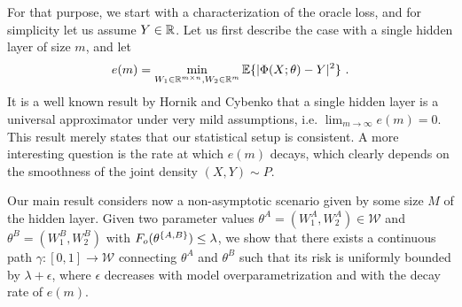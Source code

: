 For that purpose, we start with a characterization of the oracle loss, and for simplicity let us assume 
$Y \in {\mathbb{R}}$. 
Let us first describe the case with a single hidden layer of size $m$, and let
\begin{equation}
\label{bla2}
e(m) = \min_{W_1 \in {\mathbb{R}}^{m \times n}, W_2 \in {\mathbb{R}}^m} {\mathbb{E}}\{ | \Phi(X; \theta) - Y|^2 \}~.
\end{equation}
It is a well known result by Hornik and Cybenko that a single hidden layer 
is a universal approximator under very mild assumptions, i.e. $\lim_{m \to \infty} e(m) = 0$.
This result merely states that our statistical setup is consistent. A more interesting 
question is the rate at which $e(m)$ decays, which clearly depends 
on the smoothness of the joint density $(X, Y) \sim P$. 

Our main result considers now a non-asymptotic scenario given by some 
size $M$ of the hidden layer. Given two parameter values $\theta^A = (W_1^A, W_2^A) \in \mathcal{W}$ 
and $\theta^B= (W_1^B, W_2^B)$ with $F_{o}(\theta^{\{A,B\} } ) \leq \lambda$, 
we show that there exists a continuous path 
$\gamma: [0,1] \to \mathcal{W}$ connecting $\theta^A$ and $\theta^B$ 
such that its risk is uniformly bounded by $\lambda + \epsilon$, where $\epsilon$ 
decreases with model overparametrization and with the decay rate of $e(m)$.
\begin{theorem}

\end{theorem}





